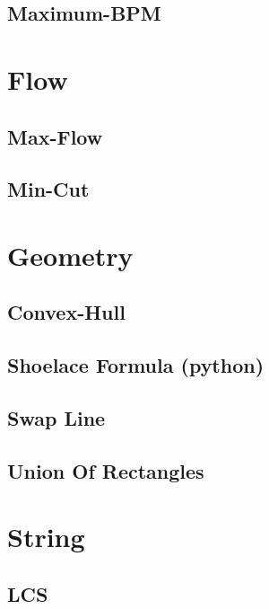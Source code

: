 \documentclass[8pt , a4paper]{report}
\begin{document}
\subsection{Maximum-BPM}


\section{Flow}

\subsection{Max-Flow}


\subsection{Min-Cut}



\section{Geometry}

\subsection{Convex-Hull}


\subsection{Shoelace Formula (python)}


\subsection{Swap Line}


\subsection{Union Of Rectangles}


\section{String}

\subsection{LCS}

\end{document}
